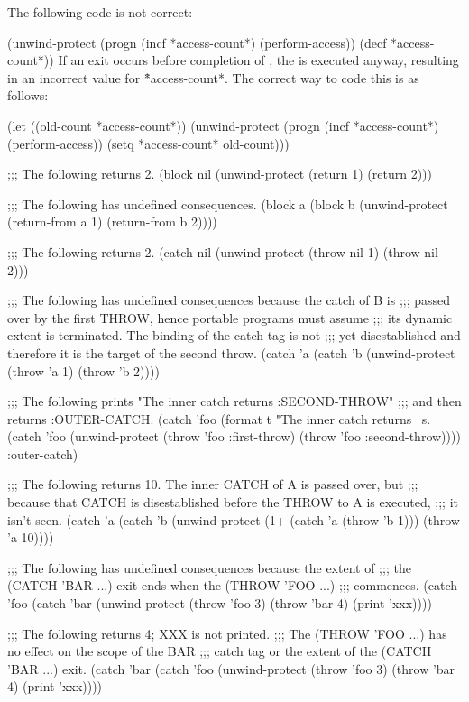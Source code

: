 The following code
is not correct:

\code
 (unwind-protect
   (progn (incf *access-count*)
          (perform-access))
   (decf *access-count*))
\endcode
If an exit occurs before completion of ,
the   is executed anyway, resulting in an
incorrect value for \f{*access-count*}.
The correct way to code this is as follows:

\code
 (let ((old-count *access-count*))
   (unwind-protect
     (progn (incf *access-count*)
            (perform-access))
     (setq *access-count* old-count)))
\endcode
 

\code
;;; The following returns 2.
 (block nil   
   (unwind-protect (return 1)
     (return 2)))
 
;;; The following has undefined consequences.
 (block a    
   (block b
     (unwind-protect (return-from a 1)
       (return-from b 2))))
 
;;; The following returns 2.
 (catch nil 
   (unwind-protect (throw nil 1)
     (throw nil 2)))
 
;;; The following has undefined consequences because the catch of B is 
;;; passed over by the first THROW, hence portable programs must assume 
;;; its dynamic extent is terminated.  The binding of the catch tag is not
;;; yet disestablished and therefore it is the target of the second throw.
 (catch 'a
   (catch 'b
     (unwind-protect (throw 'a 1)
       (throw 'b 2))))
 
;;; The following prints "The inner catch returns :SECOND-THROW"
;;; and then returns :OUTER-CATCH.
 (catch 'foo
         (format t "The inner catch returns ~s.~%
                 (catch 'foo
                     (unwind-protect (throw 'foo :first-throw)
                         (throw 'foo :second-throw))))
         :outer-catch)
 
 
;;; The following returns 10. The inner CATCH of A is passed over, but 
;;; because that CATCH is disestablished before the THROW to A is executed,
;;; it isn't seen.
 (catch 'a
   (catch 'b
     (unwind-protect (1+ (catch 'a (throw 'b 1)))
       (throw 'a 10))))
 
 
;;; The following has undefined consequences because the extent of
;;; the (CATCH 'BAR ...) exit ends when the (THROW 'FOO ...)
;;; commences.
 (catch 'foo
   (catch 'bar
       (unwind-protect (throw 'foo 3)
         (throw 'bar 4)
         (print 'xxx))))
 
 
;;; The following returns 4; XXX is not printed.
;;; The (THROW 'FOO ...) has no effect on the scope of the BAR
;;; catch tag or the extent of the (CATCH 'BAR ...) exit.
 (catch 'bar
   (catch 'foo
       (unwind-protect (throw 'foo 3)
         (throw 'bar 4)
         (print 'xxx))))
 
